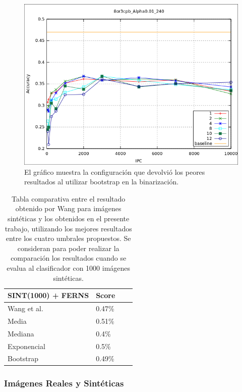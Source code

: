 			\begin{figure}[htbp]
				\centering
				\includegraphics[scale=0.6]{img/resultados/sinteticas/worst_bootstrap_8or3cpb_Alpha0,01_240.png}
				\caption[Sintéticas bootstrap peor resultado]{El gráfico muestra la configuración que devolvió los peores resultados al utilizar bootstrap en la binarización.}
				\label{fig: Sinteticas-bootstrap-bajo}
			\end{figure}


	\begin{table}
		\centering
		\begin{tabular}{ | l | l | l | p{5cm} |}
    			\hline
    				\textbf{SINT(1000) + FERNS} & \textbf{Score} \\ \hline
    				Wang et al. & 0.47\% \\ \hline
    				Media & 0.51\% \\ \hline
    				Mediana & 0.4\%\\ \hline
    				Exponencial & 0.5\% \\ \hline
    				Bootstrap & 0.49\%\\ 
    			\hline
    		\end{tabular}
    		\caption{Tabla comparativa entre el resultado obtenido por Wang para imágenes sintéticas y los obtenidos en el presente trabajo, utilizando los mejores resultados entre los cuatro umbrales propuestos. Se consideran para poder realizar la comparación los resultados cuando se evalua al clasificador con 1000 imágenes sintéticas.}
    	\end{table}
			
\newpage
    	\subsubsection{Imágenes Reales y Sintéticas}
    	
